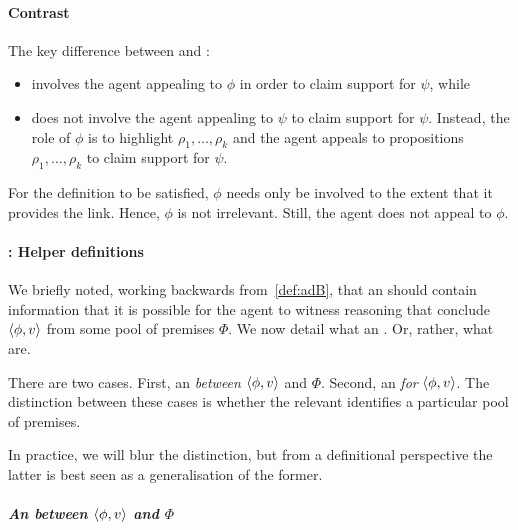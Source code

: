 \paragraph{Contrast}

\begin{note}
  The key difference between \adA{} and \adB{}:
  \begin{itemize}
  \item \adA{} involves the agent appealing to \(\phi\) in order to claim support for \(\psi\), while
  \item \adB{} does not involve the agent appealing to \(\psi\) to claim support for \(\psi\).
    Instead, the role of \(\phi\) is to highlight \(\rho_{1},\dots,\rho_{k}\) and the agent appeals to propositions \(\rho_{1},\dots,\rho_{k}\) to claim support for \(\psi\).
  \end{itemize}

  For the definition to be satisfied, \(\phi\) needs only be involved to the extent that it provides the link.
  Hence, \(\phi\) is not irrelevant.
  Still, the agent does not appeal to \(\phi\).
\end{note}

\paragraph*{\adB{}: Helper definitions}

\begin{note}[]
  We briefly noted, working backwards from~\autoref{def:adB}, that an \itp{} should contain information that it is possible for the agent to witness reasoning that conclude \(\langle \phi, v \rangle\) from some pool of premises \(\Phi\).
  We now detail what an .
  Or, rather, what  are.

  There are two cases.
  First, an  \emph{between} \(\langle \phi, v \rangle\) and \(\Phi\).
  Second, an  \emph{for} \(\langle \phi, v \rangle\).
  The distinction between these cases is whether the relevant  identifies a particular pool of premises.

  In practice, we will blur the distinction, but from a definitional perspective the latter is best seen as a generalisation of the former.
\end{note}

\subparagraph*{An  between \(\langle \phi, v \rangle\) and \(\Phi\)}

